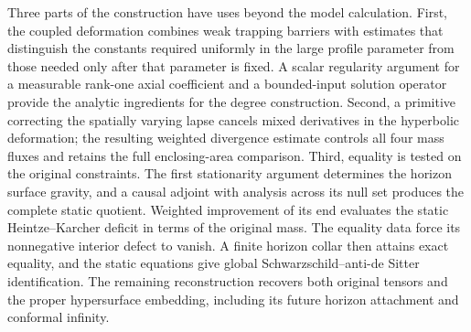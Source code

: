 Three parts of the construction have uses beyond the model calculation.
First, the coupled deformation combines weak trapping barriers with
estimates that distinguish the constants required uniformly in the large
profile parameter from those needed only after that parameter is fixed.
A scalar regularity argument for a measurable rank-one axial coefficient
and a bounded-input solution operator provide the analytic ingredients
for the degree construction.  Second, a primitive correcting the spatially
varying lapse cancels mixed derivatives in the hyperbolic deformation;
the resulting weighted divergence estimate controls all four mass fluxes
and retains the full enclosing-area comparison.  Third, equality is tested
on the original constraints.  The first stationarity argument determines
the horizon surface gravity, and a causal adjoint with analysis across its
null set produces the complete static quotient.  Weighted improvement of
its end evaluates the static Heintze--Karcher deficit in terms of the
original mass. The equality data force its nonnegative interior defect
to vanish. A finite horizon collar then attains exact equality, and the
static equations give global Schwarzschild--anti-de Sitter identification.
The remaining reconstruction recovers both original tensors and the proper
hypersurface embedding, including its future horizon attachment and
conformal infinity.
